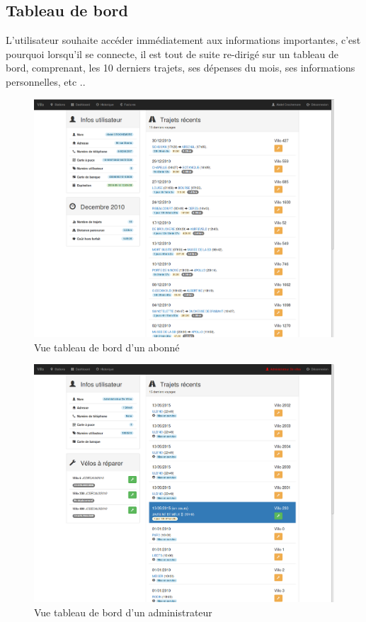 \documentclass[a4paper,10pt]{article}
\begin{document}
\subsection{Tableau de bord}
L'utilisateur souhaite accéder immédiatement aux informations importantes,
c'est pourquoi lorsqu'il se connecte, il est tout de suite re-dirigé sur
un tableau de bord, comprenant, les 10 derniers trajets, ses dépenses du mois,
ses informations personnelles, etc ..

\begin{figure}[H]
  \centering
  \includegraphics[scale=0.2]{Dashboard.png}
  \caption{\label{fig:dashboard} Vue tableau de bord d'un abonné}
\end{figure}

\begin{figure}[H]
  \centering
  \includegraphics[scale=0.2]{Dashboard-admin.png}
  \caption{\label{fig:dashboard} Vue tableau de bord d'un administrateur}
\end{figure}
\end{document}
